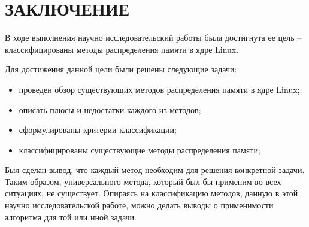 \section*{ЗАКЛЮЧЕНИЕ}

В ходе выполнения научно исследовательский работы была достигнута ее цель --  классифицированы методы распределения памяти в ядре Linux.

Для достижения данной цели были решены следующие задачи:

\begin{itemize}
	\item проведен обзор существующих методов распределения памяти в ядре Linux;
	\item описать плюсы и недостатки каждого из методов;
	\item сформулированы критерии классификации;
	\item классифицированы существующие методы распределения памяти;
\end{itemize}

Был сделан вывод, что каждый метод необходим для решения конкретной задачи. Таким образом, универсального метода, который был бы применим во всех ситуациях, не существует. Опираясь на классификацию методов, данную в этой научно исследовательской работе, можно делать выводы о применимости алгоритма для той или иной задачи.

\pagebreak
